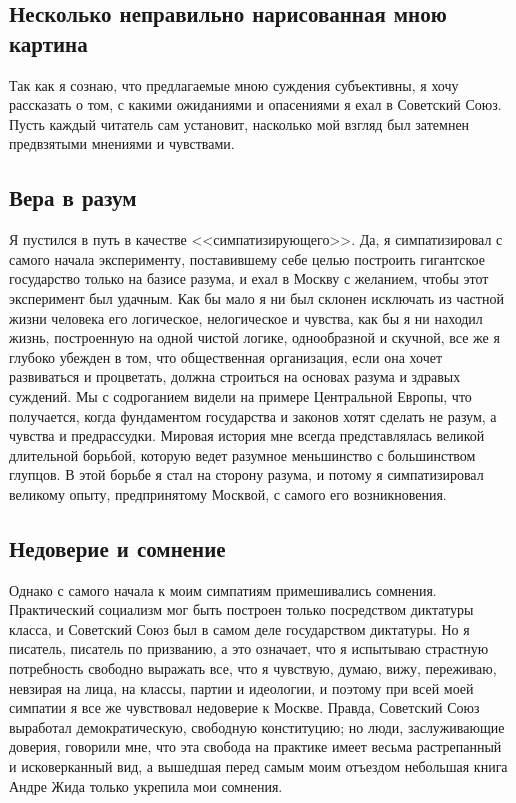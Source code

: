 \documentclass[12pt, a4paper, openany]{book}
\begin{document}
\subsection*{Несколько неправильно нарисованная мною картина}
Так как я сознаю, что предлагаемые мною суждения субъективны, я хочу рассказать о том, с какими ожиданиями и опасениями я ехал в Советский Союз. Пусть каждый читатель сам установит, насколько мой взгляд был затемнен предвзятыми мнениями и чувствами.


\subsection*{Вера в разум}

Я пустился в путь в качестве <<симпатизирующего>>. Да, я симпатизировал с самого начала эксперименту, поставившему себе целью построить гигантское государство только на базисе разума, и ехал в Москву с желанием, чтобы этот эксперимент был удачным. Как бы мало я ни был склонен исключать из частной жизни человека его логическое, нелогическое и чувства, как бы я ни находил жизнь, построенную на одной чистой логике, однообразной и скучной, все же я глубоко убежден в том, что общественная организация, если она хочет развиваться и процветать, должна строиться на основах разума и здравых суждений. Мы с содроганием видели на примере Центральной Европы, что получается, когда фундаментом государства и законов хотят сделать не разум, а чувства и предрассудки. Мировая история мне всегда представлялась великой длительной борьбой, которую ведет разумное меньшинство с большинством глупцов. В этой борьбе я стал на сторону разума, и потому я симпатизировал великому опыту, предпринятому Москвой, с самого его возникновения.

\subsection*{Недоверие и сомнение}
Однако с самого начала к моим симпатиям примешивались сомнения. Практический социализм мог быть построен только посредством диктатуры класса, и Советский Союз был в самом деле государством диктатуры. Но я писатель, писатель по призванию, а это означает, что я испытываю страстную потребность свободно выражать все, что я чувствую, думаю, вижу, переживаю, невзирая на лица, на классы, партии и идеологии, и поэтому при всей моей симпатии я все же чувствовал недоверие к Москве. Правда, Советский Союз выработал демократическую, свободную конституцию; но люди, заслуживающие доверия, говорили мне, что эта свобода на практике имеет весьма растрепанный и исковерканный вид, а вышедшая перед самым моим отъездом небольшая книга Андре Жида только укрепила мои сомнения.
\end{document}
